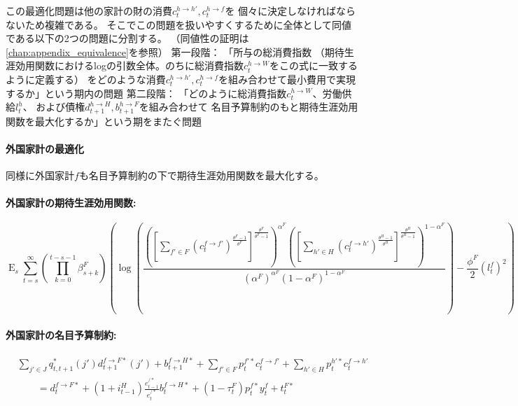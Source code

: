 この最適化問題は他の家計の財の消費\(c_t^{h\to h'},c_t^{h\to f}\)を
個々に決定しなければならないため複雑である。
そこでこの問題を扱いやすくするために全体として同値である以下の2つの問題に分割する。
（同値性の証明は\ref{chap:appendix_equivalence}を参照）
第一段階：
「所与の総消費指数
（期待生涯効用関数におけるlogの引数全体。のちに総消費指数\(c_t^{h\to W}\)をこの式に一致するように定義する）
をどのような消費\(c_t^{h\to h'},c_t^{h\to f}\)を組み合わせて最小費用で実現するか」という期内の問題
第二段階：
「どのように総消費指数\(c_t^{h\to W}\)、労働供給\(l_t^h\)、
および債権\(d_{t+1}^{h\to H},b_{t+1}^{h\to F}\)を組み合わせて
名目予算制約のもと期待生涯効用関数を最大化するか」という期をまたぐ問題

\paragraph{外国家計の最適化}
\label{sec:model_households_optimization_foreign}
同様に外国家計\(f\)も名目予算制約の下で期待生涯効用関数を最大化する。

\paragraph{外国家計の期待生涯効用関数:}
\label{sec:model_households_optimization_foreign_utility}
\begin{equation}
\label{form:model_households_optimization_foreign_utility_function}
    \operatorname{E}_s\sum_{t=s}^{\infty}\left(\prod_{k=0}^{t-s-1}\beta_{s+k}^F\right)\left(\log\left(\frac{\left(\left[\sum_{f'\in F}(c_t^{f\to f'})^{\frac{\theta^F-1}{\theta^F}}\right]^{\frac{\theta^F}{\theta^F-1}}\right)^{\alpha^F}\left(\left[\sum_{h'\in H}(c_t^{f\to h'})^{\frac{\theta^H-1}{\theta^H}}\right]^{\frac{\theta^H}{\theta^H-1}}\right)^{1-\alpha^F}}{(\alpha^F)^{\alpha^F}(1-\alpha^F)^{1-\alpha^F}}\right)-\frac{\phi^F}{2}(l_t^f)^2\right)
\end{equation}

\paragraph{外国家計の名目予算制約:}
\label{sec:model_households_optimization_foreign_budget}
\begin{equation}
\label{form:model_households_optimization_foreign_budget_equation}
    \begin{aligned}
        &\sum_{j'\in J}q_{t,t+1}^*(j')d_{t+1}^{f\to F*}(j')+b_{t+1}^{f\to H*}+\sum_{f'\in F}p_t^{f'*}c_t^{f\to f'}+\sum_{h'\in H}p_t^{h'*}c_t^{f\to h'} \\
        &\qquad=d_t^{f\to F*}+(1+i_{t-1}^H)\frac{e_{t-1}^{/*}}{e_t^{/*}}b_t^{f\to H*}+(1-\tau_t^F)p_t^{f*}y_t^f+t_t^{F*}
    \end{aligned}
\end{equation}